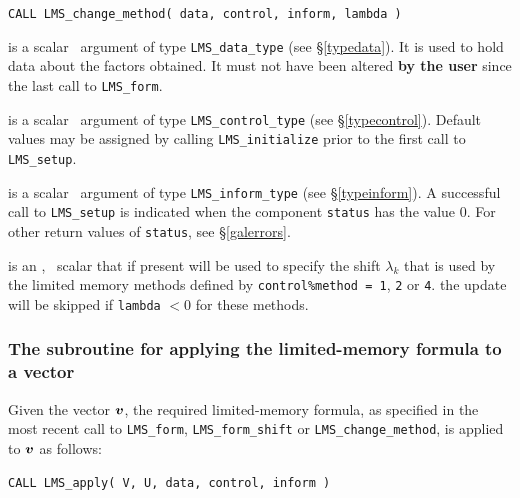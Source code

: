 \documentclass{galahad}
\newcommand{\packagename}{LMS}
\begin{document}
\hspace{8mm}
{\tt CALL \packagename\_change\_method( data, control, inform, lambda )}

\vspace*{-3mm}
\begin{description}

 is a scalar \intentinout\ argument of type
{\tt \packagename\_data\_type}
(see \S\ref{typedata}). It is used to hold data about the factors obtained.
It must not have been altered {\bf by the user} since the last call to
{\tt \packagename\_form}.

 is a scalar \intentin\ argument of type
{\tt \packagename\_control\_type}
(see \S\ref{typecontrol}). Default values may be assigned by calling
{\tt \packagename\_initialize} prior to the first call to
{\tt \packagename\_setup}.

 is a scalar \intentout\ argument of type
{\tt \packagename\_inform\_type}
(see \S\ref{typeinform}). A successful call to
{\tt \packagename\_setup}
is indicated when the  component {\tt status} has the value 0.
For other return values of {\tt status}, see \S\ref{galerrors}.

 is an \optional, \intentin\ \realdp scalar that if present
will be used to specify the shift $\lambda_k$ that is used by the
limited memory methods defined by
{\tt control\%method = 1}, {\tt 2} or {\tt 4}.
\restriction the update will be skipped if {\tt lambda} $< 0$
for these methods.

\end{description}


\subsubsection{The subroutine for applying the limited-memory formula to a
vector}
Given the vector ${\bm{v}}$, the required limited-memory formula,
as specified in the most recent call to {\tt \packagename\_form},
{\tt \packagename\_form\_\-shift} or
{\tt \packagename\_change\_method},
is applied to ${\bm{v}}$ as follows:
\vspace*{1mm}

\hspace{8mm}
{\tt CALL \packagename\_apply( V, U, data, control, inform )}
\end{document}
